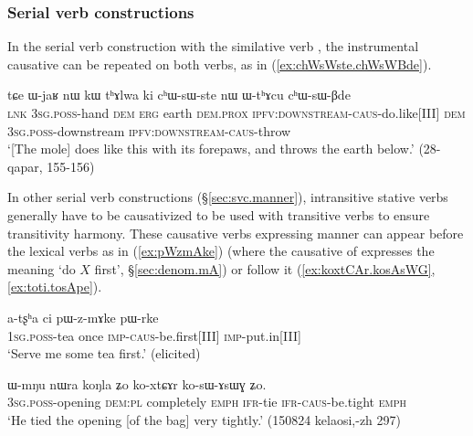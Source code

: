  
 
\subsubsection{Serial verb constructions} \label{sec:sig.caus.serial}
In the serial verb construction with the similative verb , the instrumental causative can be repeated on both verbs, as in (\ref{ex:chWsWste.chWsWBde}).

\begin{exe}
\ex \label{ex:chWsWste.chWsWBde}
\gll  tɕe ɯ-jaʁ nɯ kɯ tʰɤlwa ki cʰɯ-sɯ-ste nɯ ɯ-tʰɤcu cʰɯ-sɯ-βde \\
\textsc{lnk} \textsc{3sg}.\textsc{poss}-hand \textsc{dem} \textsc{erg} earth \textsc{dem}.\textsc{prox} \textsc{ipfv}:\textsc{downstream}-\textsc{caus}-do.like[III] \textsc{dem} \textsc{3sg}.\textsc{poss}-downstream \textsc{ipfv}:\textsc{downstream}-\textsc{caus}-throw \\
\glt `[The mole] does like this with its forepaws, and throws the earth below.' (28-qapar, 155-156)
\end{exe}

In other serial verb constructions (§\ref{sec:svc.manner}), intransitive stative verbs generally have to be causativized to be used with transitive verbs to ensure transitivity harmony. These causative verbs expressing manner can appear before the lexical verbs as in (\ref{ex:pWzmAke}) (where the causative of  expresses the meaning `do $X$ first', §\ref{sec:denom.mA}) or follow it (\ref{ex:koxtCAr.kosAsWG}, \ref{ex:toti.tosApe}).

\begin{exe}
\ex \label{ex:pWzmAke}
\gll a-tʂʰa ci pɯ-z-mɤke pɯ-rke \\
\textsc{1sg}.\textsc{poss}-tea once \textsc{imp}-\textsc{caus}-be.first[III] \textsc{imp}-put.in[III] \\
\glt `Serve me some tea first.' (elicited)
\end{exe} 

\begin{exe}
\ex \label{ex:koxtCAr.kosAsWG}
\gll  ɯ-mŋu nɯra koŋla ʑo ko-xtɕɤr ko-sɯ-ɤsɯɣ ʑo. \\
\textsc{3sg}.\textsc{poss}-opening \textsc{dem}:\textsc{pl} completely \textsc{emph} \textsc{ifr}-tie \textsc{ifr}-\textsc{caus}-be.tight \textsc{emph} \\
\glt `He tied the opening [of the bag] very tightly.' (150824 kelaosi,-zh 297)
\end{exe} 

